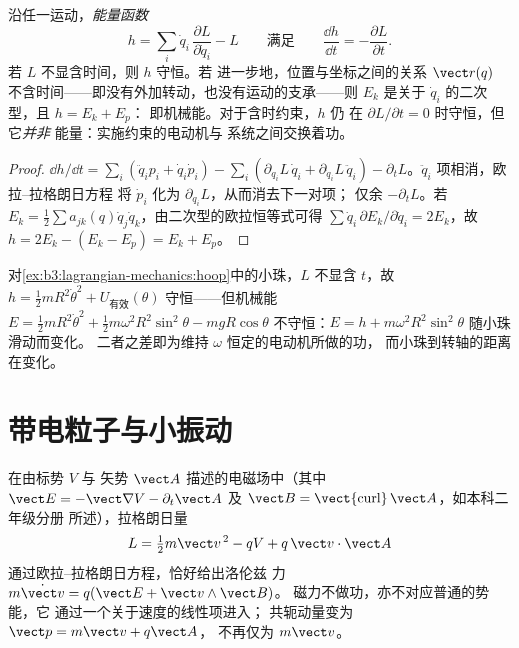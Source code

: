 \begin{proposition}[能量函数]\label{prop:b3:lagrangian-mechanics:energy}
沿任一运动，\emph{能量函数}
\[
h = \sum_i \dot q_i\,\frac{\partial L}{\partial\dot q_i} - L
\qquad\text{满足}\qquad
\frac{\dd h}{\dd t} = -\frac{\partial L}{\partial t} .
\]
若 $L$ 不显含时间，则 $h$ 守恒。若
进一步地，位置与坐标之间的关系 $\vect r(q)$
不含时间——即没有外加转动，也没有运动的支承——则
$E_k$ 是关于 $\dot q_i$ 的二次型，且 $h = E_k + E_p$：
即机械能。对于含时约束，$h$ 仍
在 $\partial L/\partial t = 0$ 时守恒，但它\emph{并非}
能量：实施约束的电动机与
系统之间交换着功。
\end{proposition}

\begin{proof}
$\dd h/\dd t = \sum_i(\ddot q_ip_i + \dot q_i\dot p_i) -
\sum_i(\partial_{q_i}L\,\dot q_i + \partial_{\dot q_i}L\,\ddot q_i) -
\partial_tL$。$\ddot q_i$ 项相消，欧拉–拉格朗日方程
将 $\dot p_i$ 化为 $\partial_{q_i}L$，从而消去下一对项；
仅余 $-\partial_tL$。若 $E_k = \tfrac12\sum a_{jk}(q)\dot
q_j\dot q_k$，由二次型的欧拉恒等式可得 $\sum\dot
q_i\,\partial E_k/\partial\dot q_i = 2E_k$，故 $h = 2E_k - (E_k - E_p)
= E_k + E_p$。
\end{proof}

\begin{example}[旋转圆环守恒 $h$，而非 $E$]\label{ex:b3:lagrangian-mechanics:hoop-energy}
对\cref{ex:b3:lagrangian-mechanics:hoop}中的小珠，$L$ 不显含
$t$，故 $h = \tfrac12 mR^2\dot\theta^2 + U_{\text{有效}}
(\theta)$ 守恒——但机械能 $E = \tfrac12
mR^2\dot\theta^2 + \tfrac12 m\omega^2R^2\sin^2\theta - mgR\cos\theta$
不守恒：$E = h + m\omega^2R^2\sin^2\theta$ 随小珠滑动而变化。
二者之差即为维持 $\omega$ 恒定的电动机所做的功，
而小珠到转轴的距离在变化。
\end{example}

\section{带电粒子与小振动}

\begin{proposition}[带电粒子的拉格朗日量]\label{prop:b3:lagrangian-mechanics:charge}
在由标势 $V$ 与
矢势 $\vect A$ 描述的电磁场中（其中 $\vect E = -\vect\nabla V - \partial_t\vect A$ 及
$\vect B = \operatorname{\vect{curl}}\vect A$，如本科二年级分册
所述），拉格朗日量
\[
L = \tfrac12 m\vect v^{\,2} - qV + q\,\vect v\cdot\vect A
\]
通过欧拉–拉格朗日方程，恰好给出洛伦兹
力 $m\dot{\vect v} = q(\vect E + \vect v\wedge\vect B)$。
磁力不做功，亦不对应普通的势能，它
通过一个关于速度的线性项进入；
共轭动量变为 $\vect p = m\vect v + q\vect A$，
不再仅为 $m\vect v$。
\end{proposition}

